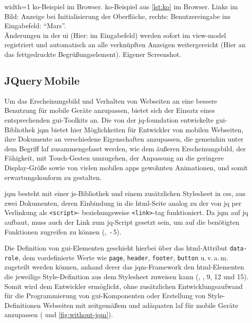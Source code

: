 	{width=1\textwidth}
	{\gls{ko}-Beispiel im Browser.}
		{\gls{ko}-Beispiel aus \autoref{lst:ko} im Browser. Links im Bild: Anzeige bei Initialisierung der Oberfläche, rechts: Benutzereingabe ins Eingabefeld: \enquote{Mars}. \\ Änderungen in der \gls{ui} (Hier: im Eingabefeld) werden sofort im \gls{view-model} registriert und automatisch an alle verknüpften Anzeigen weitergereicht (Hier an das fettgedruckte Begrüßungselement).}
	{Eigener Screenshot.}

\subsection{JQuery\,Mobile}

Um das Erscheinungsbild und Verhalten von Webseiten an eine bessere Benutzung für mobile Geräte anzupassen, bietet sich der Einsatz eines entsprechenden \gls{gui}-Toolkits an. 
Die von der \gls{jq-foundation} entwickelte \gls{gui}-Bibliothek \gls{jqm} bietet hier Möglichkeiten für Entwickler von mobilen Webseiten, ihre Dokumente an verschiedene Eigenschaften anzupassen, die gemeinhin unter dem Begriff \gls{laf} zusammengefasst werden, wie dem äußeren Erscheinungsbild, der Fähigkeit, mit Touch-Gesten umzugehen, der Anpassung an die geringere Display-Größe sowie von vielen mobilen \glspl{app} gewohnten Animationen, und somit erwartungskonform zu gestalten.

\Gls{jqm} besteht mit einer \gls{js}-Bibliothek und einem zusätzlichen Stylesheet in \gls{css}, aus zwei Dokumenten, deren Einbindung in die \gls{html}-Seite analog zu der von \gls{jq} per Verlinkung als \lstinline|<script>|- beziehungsweise \lstinline|<link>|-\gls{tag} funktioniert.
Da \gls{jqm} auf \gls{jq} aufbaut, muss auch der Link zum \gls{jq}-Script gesetzt sein, um auf die benötigten Funktionen zugreifen zu können (, \,-\,5).

	
Die Definition von \gls{gui}-Elementen geschieht hierbei über das \gls{html}-Attribut \lstinline|data-role|, dem vordefinierte Werte wie \lstinline|page|, \lstinline|header|, \lstinline|footer|, \lstinline|button| u.\,v.\,a.\,m. zugeteilt werden können, anhand derer das \gls{jqm}-Framework den \gls{html}-Elementen die jeweilige Style-Definition aus dem Stylesheet zuweisen kann (, , 9, 12 und 15).
Somit wird dem Entwickler ermöglicht, ohne zusätzlichen Entwicklungsaufwand für die Programmierung von \gls{gui}-Komponenten oder Erstellung von Style-Definitionen Webseiten mit zeitgemäßem und adäquaten \gls{laf} für mobile Geräte anzupassen ( und \ref{fig:without-jqm}).

